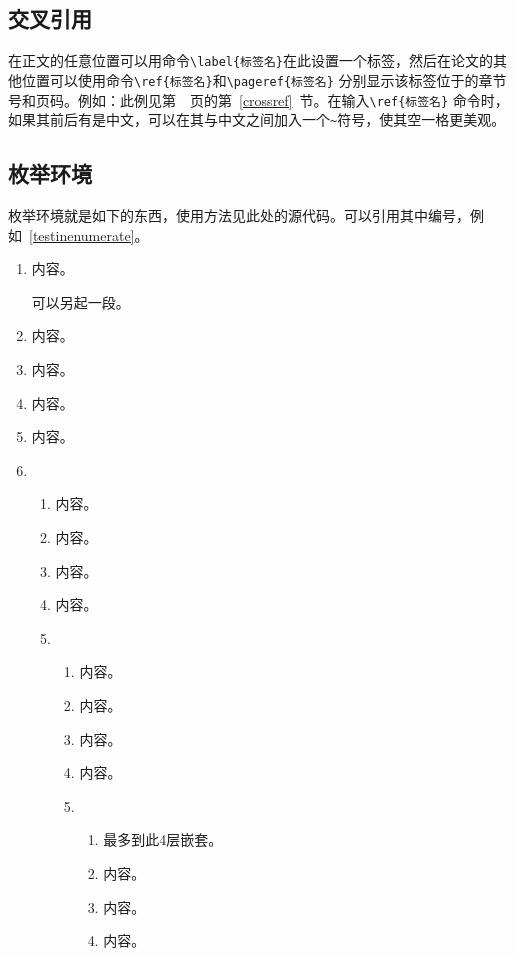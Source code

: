 \subsection{交叉引用}
在正文的任意位置可以用命令\verb|\label{标签名}|\label{crossref}在此设置一个标签，然后在论文的其他位置可以使用命令\verb|\ref{标签名}|和\verb|\pageref{标签名}| 分别显示该标签位于的章节号和页码。例如：此例见第~\pageref{crossref}~页的第~\ref{crossref}~节。在输入\verb|\ref{标签名}| 命令时，如果其前后有是中文，可以在其与中文之间加入一个\verb|~|符号，使其空一格更美观。

\subsection{枚举环境}
枚举环境就是如下的东西，使用方法见此处的源代码。可以引用其中编号，例如~\ref{testinenumerate}。
\begin{enumerate}
\item 内容。

可以另起一段。
\item 内容。
\item 内容。
\item 内容。
\item 内容。
\item
    \begin{enumerate}
    \item 内容。
    \item 内容。
    \item 内容。
    \item 内容。
    \item
        \begin{enumerate}
        \item 内容。
        \item 内容。
        \item 内容。
        \item 内容。
        \item
            \begin{enumerate}
            \item 最多到此4层嵌套。
            \item 内容。
            \item 内容。
            \item 内容\label{testinenumerate}。
            \end{enumerate}
        \end{enumerate}
    \end{enumerate}
\end{enumerate}
